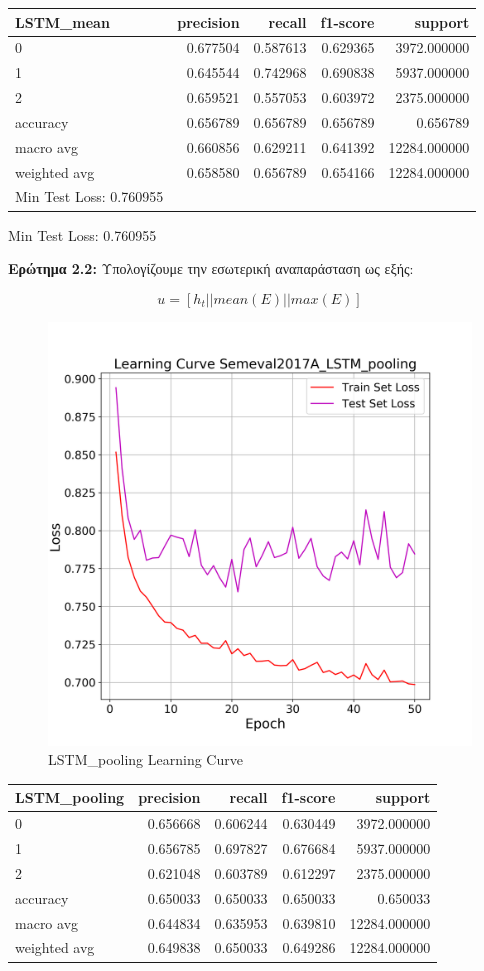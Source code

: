 \documentclass[12pt]{article}
\begin{document}
\begin{tabular}{lrrrr}
\toprule
LSTM\_mean &  precision &    recall &  f1-score &       support \\
\midrule
0            &   0.677504 &  0.587613 &  0.629365 &   3972.000000 \\
1            &   0.645544 &  0.742968 &  0.690838 &   5937.000000 \\
2            &   0.659521 &  0.557053 &  0.603972 &   2375.000000 \\
accuracy     &   0.656789 &  0.656789 &  0.656789 &      0.656789 \\
macro avg    &   0.660856 &  0.629211 &  0.641392 &  12284.000000 \\
weighted avg &   0.658580 &  0.656789 &  0.654166 &  12284.000000 \\
\bottomrule

Min Test Loss: 0.760955

\end{tabular}

Min Test Loss: 0.760955


\textbf{Ερώτημα 2.2:}
Υπολογίζουμε την εσωτερική αναπαράσταση ως εξής:

$$u = [h_t || mean(E) || max(E)]$$

\begin{figure}[h!]
	\centering
	\includegraphics[width=0.6\linewidth]{./img/Semeval2017A/LSTM_pooling_loss.png}
	\caption{LSTM\_pooling Learning Curve}
	\label{fig:sin}
\end{figure}

\begin{tabular}{lrrrr}
\toprule
LSTM\_pooling &  precision &    recall &  f1-score &       support \\
\midrule
0            &   0.656668 &  0.606244 &  0.630449 &   3972.000000 \\
1            &   0.656785 &  0.697827 &  0.676684 &   5937.000000 \\
2            &   0.621048 &  0.603789 &  0.612297 &   2375.000000 \\
accuracy     &   0.650033 &  0.650033 &  0.650033 &      0.650033 \\
macro avg    &   0.644834 &  0.635953 &  0.639810 &  12284.000000 \\
weighted avg &   0.649838 &  0.650033 &  0.649286 &  12284.000000 \\
\bottomrule
\end{tabular}
\end{document}
